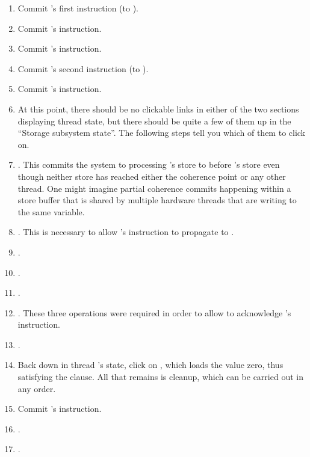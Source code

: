 \begin{enumerate}
\item	Commit 's first  instruction (to ).
\item	Commit 's  instruction.
\item	Commit 's  instruction.
\item	Commit 's second  instruction (to ).
\item	Commit 's  instruction.
\item	At this point, there should be no clickable links in either of
	the two sections displaying thread state, but there should be
	quite a few of them up in the ``Storage subsystem state''.
	The following steps tell you which of them to click on.
\item	{}.
	This commits the system to processing 's store to
	 before 's store even though neither store
	has reached either the coherence point or any other thread.
	One might imagine partial coherence commits happening within a
	store buffer that is shared by multiple hardware threads
	that are writing to the same variable.
\item	{}.
	This is necessary to allow 's  instruction
	to propagate to .
\item	{}.
\item	{}.
\item	{}.
\item	{}.
	These three operations were required in order to allow 
	to acknowledge 's  instruction.
\item	{}.
\item	Back down in thread 's state, click on , which loads the value zero, thus satisfying the 
	clause.
	All that remains is cleanup, which can be carried out in any order.
\item	Commit 's  instruction.
\item	{}.
\item	{}.
\end{enumerate}

